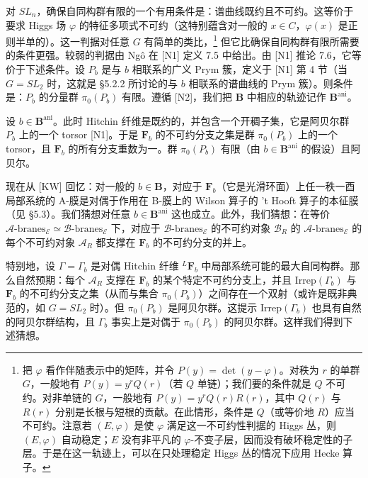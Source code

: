 对 $SL_n$，确保自同构群有限的一个有用条件是：谱曲线既约且不可约。这等价于要求 Higgs 场 $\varphi$ 的特征多项式不可约（这特别蕴含对一般的 $x\in C$，$\varphi(x)$ 是正则半单的）。这一判据对任意 $G$ 有简单的类比，\footnote{把 $\varphi$ 看作伴随表示中的矩阵，并令 $P(y)=\det(y-\varphi)$。对秩为 $r$ 的单群 $G$，一般地有 $P(y)=y^rQ(r)$（若 $Q$ 单链）；我们要的条件就是 $Q$ 不可约。对非单链的 $G$，一般地有 $P(y)=y^rQ(r)R(r)$，其中 $Q(r)$ 与 $R(r)$ 分别是长根与短根的贡献。在此情形，条件是 $Q$（或等价地 $R$）应当不可约。注意若 $(E,\varphi)$ 是使 $\varphi$ 满足这一不可约性判据的 Higgs 丛，则 $(E,\varphi)$ 自动稳定；$E$ 没有非平凡的 $\varphi$-不变子层，因而没有破坏稳定性的子层。于是在这一轨迹上，可以在只处理稳定 Higgs 丛的情况下应用 Hecke 算子。}
但它比确保自同构群有限所需要的条件更强。较弱的判据由 Ngô 在 [N1] 定义 7.5 中给出。由 [N1] 推论 7.6，它等价于下述条件。设 $P_b$ 是与 $b$ 相联系的广义 Prym 簇，定义于 [N1] 第 4 节（当 $G=SL_2$ 时，这就是 §5.2.2 所讨论的与 $b$ 相联系的谱曲线的 Prym 簇）。则条件是：$P_b$ 的分量群 $\pi_0(P_b)$ 有限。遵循 [N2]，我们把 $\boldsymbol{B}$ 中相应的轨迹记作 $\boldsymbol{B}^{\mathrm{ani}}$。


设 $b\in\boldsymbol{B}^{\mathrm{ani}}$。此时 Hitchin 纤维是既约的，并包含一个开稠子集，它是阿贝尔群 $P_b$ 上的一个 torsor [N1]。于是 $\boldsymbol{F}_b$ 的不可约分支之集是群 $\pi_0(P_b)$ 上的一个 torsor，且 $\boldsymbol{F}_b$ 的所有分支重数为一。群 $\pi_0(P_b)$ 有限（由 $b\in\boldsymbol{B}^{\mathrm{ani}}$ 的假设）且阿贝尔。

现在从 [KW] 回忆：对一般的 $b\in\boldsymbol{B}$，对应于 $\boldsymbol{F}_b$（它是光滑环面）上任一秩一酉局部系统的 A-膜是对偶于作用在 B-膜上的 Wilson 算子的 't Hooft 算子的本征膜（见 §5.3）。我们猜想对任意 $b\in\boldsymbol{B}^{\mathrm{ani}}$ 这也成立。此外，我们猜想：在等价 $\mathcal{A}\text{-branes}_{\mathcal{E}}\simeq\mathcal{B}\text{-branes}_{\mathcal{E}}$ 下，对应于 $\mathcal{B}\text{-branes}_{\mathcal{E}}$ 的不可约对象 $\mathcal{B}_R$ 的 $\mathcal{A}\text{-branes}_{\mathcal{E}}$ 的每个不可约对象 $\mathcal{A}_R$ 都支撑在 $\boldsymbol{F}_b$ 的不可约分支的并上。

特别地，设 $\Gamma=\Gamma_b$ 是对偶 Hitchin 纤维 ${}^{L}\boldsymbol{F}_b$ 中局部系统可能的最大自同构群。那么自然预期：每个 $\mathcal{A}_R$ 支撑在 $\boldsymbol{F}_b$ 的某个特定不可约分支上，并且 $\mathrm{Irrep}(\Gamma_b)$ 与 $\boldsymbol{F}_b$ 的不可约分支之集（从而与集合 $\pi_0(P_b)$）之间存在一个双射（或许是既非典范的，如 $G=SL_2$ 时）。但 $\pi_0(P_b)$ 是阿贝尔群。这提示 $\mathrm{Irrep}(\Gamma_b)$ 也具有自然的阿贝尔群结构，且 $\Gamma_b$ 事实上是对偶于 $\pi_0(P_b)$ 的阿贝尔群。这样我们得到下述猜想。

